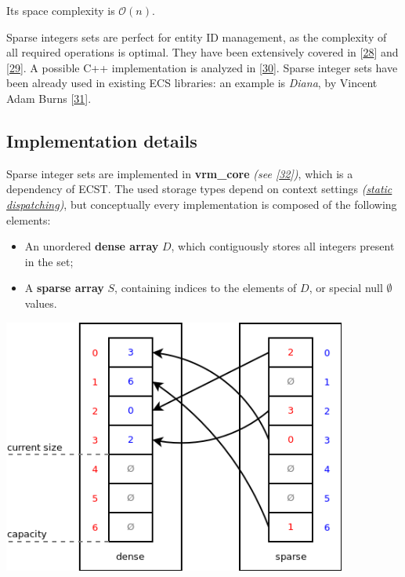 \documentclass[twoside, 12pt, a4paper, openright]{book}
\let\origfigure=\figure
\let\endorigfigure=\endfigure
\renewenvironment{figure}[1][]{%
\origfigure[H]
}{%
\endorigfigure
}
\begin{document}
Its space complexity is \(\mathcal{O}(n)\).

Sparse integers sets are perfect for entity ID management, as the
complexity of all required operations is optimal. They have been
extensively covered in {[}\protect\hyperlink{ref-sparsesets132}{28}{]}
and {[}\protect\hyperlink{ref-sparsesets_praxis}{29}{]}. A possible C++
implementation is analyzed in
{[}\protect\hyperlink{ref-sparsesets_cpp}{30}{]}. Sparse integer sets
have been already used in existing ECS libraries: an example is
\emph{Diana}, by Vincent Adam Burns
{[}\protect\hyperlink{ref-github_diana}{31}{]}.

\subsection{Implementation details}\label{implementation-details-4}

Sparse integer sets are implemented in \textbf{vrm\_core} \emph{(see
{[}\protect\hyperlink{ref-github_vrmcore}{32}{]})}, which is a
dependency of ECST. The used storage types depend on context settings
\emph{(\protect\hyperlink{appendix_static_dispatching}{static
dispatching})}, but conceptually every implementation is composed of the
following elements:

\begin{itemize}
\item
  An unordered \textbf{dense array} \(D\), which contiguously stores all
  integers present in the set;
\item
  A \textbf{sparse array} \(S\), containing indices to the elements of
  \(D\), or special null \(\emptyset\) values.
\end{itemize}

\begin{figure}[htbp]
\centering
\includegraphics[width=0.85000\textwidth]{source/figures/sparseset.png}
\caption{ECST miscellaneous: fixed sparse integer set
example}\label{sparsesetexample}
\end{figure}
\end{document}
